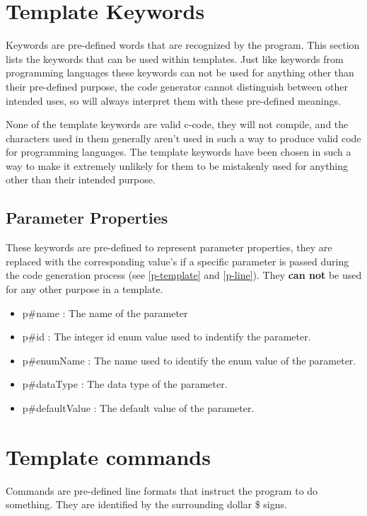 \documentclass{settings/TU_Delft_Report}
\begin{document}
\section{Template Keywords}
Keywords are pre-defined words that are recognized by the program. This section lists the keywords that can be used within templates. Just like keywords from programming languages these keywords can not be used for anything other than their pre-defined purpose, the code generator cannot distinguish between other intended uses, so will always interpret them with these pre-defined meanings.

None of the template keywords are valid c-code, they will not compile, and the characters used in them generally aren't used in such a way to produce valid code for programming languages. The template keywords have been chosen in such a way to make it extremely unlikely for them to be mistakenly used for anything other than their intended purpose.

\subsection{Parameter Properties} \label{par-keywords}
These keywords are pre-defined to represent parameter properties, they are replaced with the corresponding value's if a specific parameter is passed during the code generation process (see \ref{p-template} and \ref{p-line}). They \textbf{can not} be used for any other purpose in a template.
\begin{itemize}
    \item p\#name : The name of the parameter
    \item p\#id : The integer id enum value used to indentify the parameter.
    \item p\#enumName : The name used to identify the enum value of the parameter.
    \item p\#dataType : The data type of the parameter.
    \item p\#defaultValue : The default value of the parameter.
\end{itemize}

\section{Template commands}
Commands are pre-defined line formats that instruct the program to do something. They are identified by the surrounding dollar \$ signs.
\end{document}
